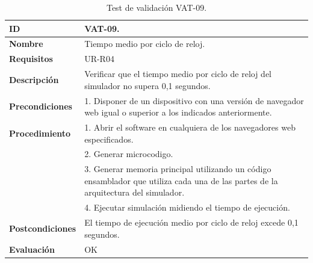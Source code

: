 \begin{center}
\begin{table}[htb]
\centering
\caption{Test de validación VAT-09.}
\begin{tabular}{@{}p{2.5cm} p{9cm}@{}} 
\toprule
\textbf{ID} 					& VAT-09. \\
\midrule
\textbf{Nombre} 				& Tiempo medio por ciclo de reloj. \\
\midrule
\textbf{Requisitos} 		& UR-R04\\
\midrule
\textbf{Descripción} 		& Verificar que el tiempo medio por ciclo de reloj del simulador no supera 0,1 segundos. \\
\midrule
\textbf{Precondiciones}		& 1. Disponer de un dispositivo con una versión de navegador web igual o superior a los indicados anteriormente. \\
\midrule
\textbf{Procedimiento}			& 1. Abrir el \gls{software} en cualquiera de los navegadores web especificados. \\
							& 2. Generar \gls{microcodigo}.\\
							& 3. Generar memoria principal utilizando un código \gls{ensamblador} que utiliza cada una de las partes de la arquitectura del simulador.\\
							& 4. Ejecutar simulación midiendo el tiempo de ejecución.\\
\midrule
\textbf{Postcondiciones} 		&  El tiempo de ejecución medio por ciclo de reloj excede 0,1 segundos.\\
\midrule
\textbf{Evaluación} 			& OK \\
\bottomrule
\end{tabular}
\label{tab:vat-09}
\end{table}
\end{center}

